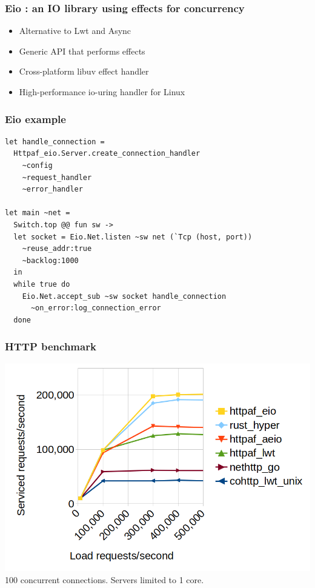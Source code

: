 \documentclass{beamer}
\begin{document}
\begin{frame}
	\frametitle{Eio : an IO library using effects for concurrency}
	\begin{itemize}
		\item Alternative to Lwt and Async
		\item Generic API that performs effects
		\item Cross-platform libuv effect handler
		\item High-performance io-uring handler for Linux
	\end{itemize}
\end{frame}

\begin{frame}[fragile]
	\frametitle{Eio example}
\begin{lstlisting}[style=ocaml]
let handle_connection =
  Httpaf_eio.Server.create_connection_handler
    ~config
    ~request_handler
    ~error_handler

let main ~net =
  Switch.top @@ fun sw ->
  let socket = Eio.Net.listen ~sw net (`Tcp (host, port))
    ~reuse_addr:true
    ~backlog:1000 
  in
  while true do
    Eio.Net.accept_sub ~sw socket handle_connection
      ~on_error:log_connection_error 
  done
\end{lstlisting}
\end{frame}

\begin{frame}
	\frametitle{HTTP benchmark}
	\includegraphics[width=\textwidth]{rps-graph.png}
	100 concurrent connections. Servers limited to 1 core.
\end{frame}
\end{document}

